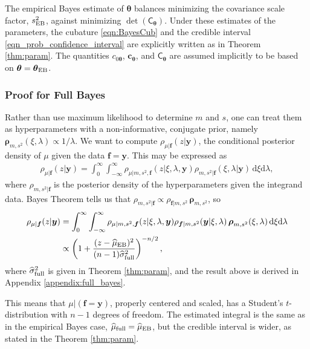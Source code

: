 \documentclass{svjour3}                     %
\newcommand{\bm}[1]{\boldsymbol{#1}}
\newcommand{\D}[1]{\text{d}{#1}}
\newcommand{\vtheta}{{\bm{\theta}}}
\newcommand{\vc}{\bm{c}}
\newcommand{\vf}{\bm{f}}
\newcommand{\vrho}{\bm{\rho}}
\newcommand{\vy}{\bm{y}}
\newcommand{\mC}{\mathsf{C}}
\newcommand{\hmu}{\widehat{\mu}}
\newcommand{\hsigma}{\widehat{\sigma}}
\newcommand{\MLE}{\textup{EB}}
\begin{document}
The empirical Bayes estimate of $\vtheta$ balances minimizing the covariance scale factor, $s^2_{\MLE}$, against minimizing  $\det(\mC_\vtheta)$. 
Under these estimates of the parameters, the cubature \eqref{eqn:BayesCub} and the credible interval \eqref{eqn_prob_confidence_interval} are explicitly written as in Theorem \ref{thm:param}.
The quantities $c_{0\vtheta}$, $\vc_\vtheta$, and $\mC_\vtheta$ are assumed implicitly to be based on $\vtheta = \vtheta_\MLE$.   


\subsubsection{Proof for Full Bayes} \label{sec:fullBayes}
Rather than use maximum likelihood to determine $m$ and $s$,  one can treat them as hyperparameters with a non-informative, conjugate prior, namely $\vrho_{m,s^2}(\xi, \lambda) \propto 1/\lambda$. We want to compute $\rho_{\mu|\vf}(z | \vy)$, the conditional posterior density of $\mu$ given the data $\vf = \vy$.  This may be expressed as 
\begin{align*}
    \rho_{\mu|\vf}(z | \vy) 
= \int_{0}^\infty \int_{-\infty}^\infty 
\rho_{\mu | m, s^2, \vf}(z | \xi, \lambda , \vy)  
\rho_{m, s^2 | \vf}(\xi, \lambda | \vy)  \, \D \xi \D \lambda, 
\end{align*}
where $\rho_{m, s^2 | \vf}$ is the posterior density of the hyperparameters given the integrand data. Bayes Theorem tells us that $\rho_{m, s^2 | \vf} \propto \rho_{\vf | m, s^2} \, \vrho_{m,s^2}$, so 
\begin{align*}
\nonumber 
    \rho_{\mu|\vf}(z | \vy) 
& = \int_{0}^\infty \int_{-\infty}^\infty 
\rho_{\mu | m, s^2, \vf}(z | \xi, \lambda , \vy) 
\rho_{\vf | m, s^2} (\vy | \xi, \lambda) \, \vrho_{m,s^2}(\xi,\lambda)  \, \D \xi \D \lambda \\
\nonumber
& \propto \left( 1 +  \frac{(z - \hmu_{\MLE})^2}{(n-1) \hsigma_{\textup{full}}^2} \right)^{-n/2},
\end{align*}
where $\hsigma_{\textup{full}}^2$ is given in Theorem \ref{thm:param}, and the result above is derived in Appendix \ref{appendix:full_bayes}.

This means that $\mu \vert (\vf = \vy )$, properly centered and scaled, has a Student's $t$-distribution with $n-1$ degrees of freedom.   The estimated integral is the same as in the empirical Bayes case, $\hmu_{\textup{full}} = \hmu_{\MLE}$, but the credible interval is wider, as stated in the Theorem \ref{thm:param}.
\end{document}
